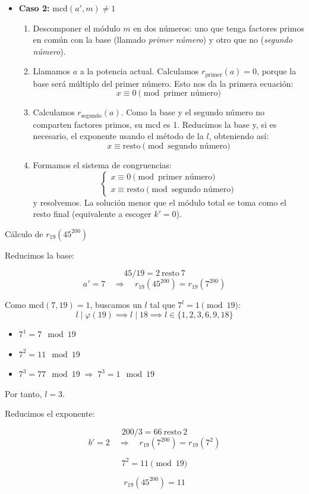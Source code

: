 \documentclass[a4paper,12pt]{article}
\begin{document}
\begin{procedimiento}[title=Reducción de potencias]
\begin{enumerate}
\begin{itemize}
    \item \textbf{Caso 2:} \(\text{mcd}(a',m)\neq1\)
    \begin{enumerate}
      \item[2.1)] Descomponer el módulo \(m\) en dos números: uno que tenga factores primos en común con la base (llamado \emph{primer número}) y otro que no (\emph{segundo número}).
      \item[2.2)] Llamamos \(a\) a la potencia actual.  
      Calculamos \(r_{\text{primer}}(a) = 0\), porque la base será múltiplo del primer número. Esto nos da la primera ecuación:
      \[
      x \equiv 0 \pmod{\text{primer número}}
      \]
      \item[2.3)] Calculamos \(r_{\text{segundo}}(a)\).  
      Como la base y el segundo número no comparten factores primos, su mcd es 1.  
      Reducimos la base y, si es necesario, el exponente usando el método de la \(l\), obteniendo así:
      \[
      x \equiv \text{resto} \pmod{\text{segundo número}}
      \]
      \item[2.4)] Formamos el sistema de congruencias:
      \[
      \begin{cases}
      x \equiv 0 \pmod{\text{primer número}}\\
      x \equiv \text{resto} \pmod{\text{segundo número}}
      \end{cases}
      \]
      y resolvemos. La solución menor que el módulo total se toma como el resto final (equivalente a escoger \(k'=0\)).
    \end{enumerate}
  \end{itemize}

\end{enumerate}
\end{procedimiento}

\begin{ejemplo}[title=Ejemplo 1: mcd es 1]
Cálculo de $r_{19}(45^{200})$

Reducimos la base:

\[
45/19 = 2\ \text{resto}\ 7
\]
\[
a' = 7 \quad\Rightarrow\quad r_{19}(45^{200}) = r_{19}(7^{200})
\]

Como \(\text{mcd}(7,19)=1\), buscamos un \(l\) tal que \(7^l = 1 \pmod{19}\):
\[
l \mid \varphi(19) \implies l \mid 18 \implies l \in \{1,2,3,6,9,18\}
\]

\begin{itemize}
  \item $7^1 = 7 \mod 19$
  \item $7^2 = 11 \mod 19$
  \item $7^3 = 77 \mod 19 \;\Rightarrow\; 7^3 = 1 \mod 19$
\end{itemize}

Por tanto, \(l = 3\).

Reducimos el exponente:

\[
200/3 = 66\ \text{resto}\ 2
\]
\[
b' = 2 \quad\Rightarrow\quad r_{19}(7^{200}) = r_{19}(7^2)
\]

\[
7^2 = 11 \pmod{19}
\]

\[
\boxed{r_{19}(45^{200}) = 11}
\]
\end{ejemplo}
\end{document}
